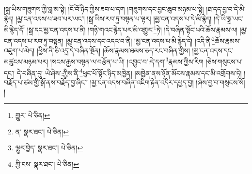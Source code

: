 །སྒྲ་ཡིས་གཟུགས་ཀྱི་བླ་མ་སྟེ། །ངོ་བོ་ཉིད་ཀྱིས་ཟབ་པ་དག །གཟུགས་དང་བྱང་ཆུབ་མཉམ་པ་སྟེ། །ཐ་དད་བྱ་བ་དེ་མི་རྙེད། །མྱ་ངན་འདས་པ་ཟབ་པར་ཡང་། །སྒྲ་ཡིས་རབ་ཏུ་བསྟན་པ་ལྟར། །མྱ་ངན་འདས་པ་དེ་མི་རྙེད། །དེ་ཡི་སྒྲ་ཡང་མི་རྙེད་དོ། །སྒྲ་དང་མྱ་ངན་འདས་པ་ནི། །གཉི་གའང་རྙེད་པར་མི་འགྱུར་\footnote{གྱུར་  པེ་ཅིན། }ཏེ། །དེ་བཞིན་སྟོང་པའི་ཆོས་རྣམས་ལ། །མྱ་ངན་འདས་པ་རབ་ཏུ་བསྟན། །མྱ་ངན་འདས་དང་འདའ་བ་ནི། །མྱ་ངན་འདས་པ་མི་རྙེད་དེ། །འདི་ནི་\footnote{ན་  སྣར་ཐང་།  པེ་ཅིན། }ཆོས་རྣམས་འཇུག་པ་མེད། །ཕྱིས་ནི་ཅི་འདྲ་དེ་བཞིན་སྔོན། །ཆོས་རྣམས་ཐམས་ཅད་རང་བཞིན་གྱིས། །མྱ་ངན་འདས་དང་མཚུངས་མཉམ་པར། །སངས་རྒྱས་བསྟན་ལ་བརྩོན་པ་ཡི། །འབྱུང་བ་:དེ་དག་\footnote{ལྷུར་བྱེད་  སྣར་ཐང་།  པེ་ཅིན། }རྣམས་ཀྱིས་རིག །ཅེས་གསུངས་པ་དང་། དེ་བཞིན་དུ། ཡེ་ཤེས་:ཀྱིས་ནི་\footnote{ཀྱི་ངས་  སྣར་ཐང་།  པེ་ཅིན། }ཕུང་པོ་སྟོང་ཉིད་མཁྱེན། །མཁྱེན་ནས་ཉོན་མོངས་རྣམས་དང་མི་འགྲོགས་ཏེ། །བརྗོད་པ་ཙམ་གྱི་སྒོ་ནས་བརྗོད་བྱ་ཞིང་། །མྱ་ངན་འདས་བཞིན་འཇིག་རྟེན་འདིར་དཔྱད་བྱ། །ཞེས་བྱ་བ་གསུངས་སོ། །
